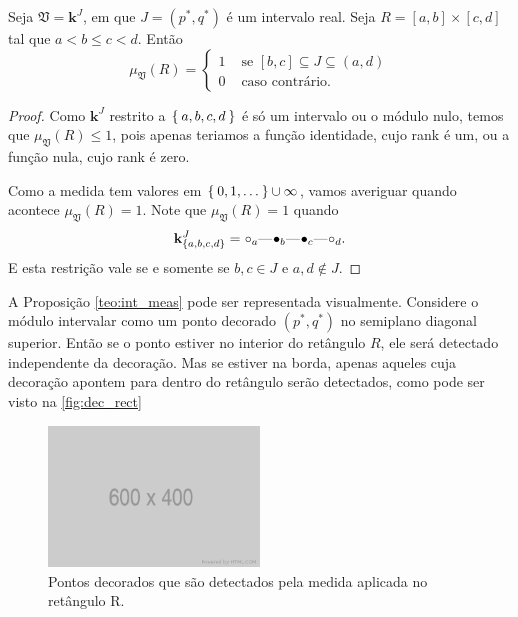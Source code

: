\begin{propo}\label{teo:int_meas}
    Seja $\mathfrak{V} = \mathbf{k}^J$, em que $J=(p^*, q^*)$ é um intervalo real. Seja $R=[a,b]\times[c,d]$
    tal que $a < b \leq c < d$. Então
    \begin{equation*}
        \mu_{\mathfrak{V}}(R) = \left\{
        \begin{split}
            1 & \text{ se } [b,c] \subseteq J \subseteq (a,d) \\
            0 & \text{ caso contrário.}
        \end{split}
        \right.
    \end{equation*}
\end{propo} 
\begin{proof}
    Como $\mathbf{k}^J$ restrito a $\Set{a,b,c,d}$ é só um intervalo ou o módulo nulo, temos que $\mu_{\mathfrak{V}}(R)
    \leq 1$, pois apenas teriamos a função identidade, cujo rank é um, ou a função nula, cujo rank é zero. 

    Como a medida tem valores em $\Set{0,1,\dots} \cup {\infty}$, vamos averiguar quando acontece $\mu_{\mathfrak{V}}(R)
    = 1$. Note que $\mu_{\mathfrak{V}}(R) = 1$ quando 
    \begin{equation*}    
        \mathbf{k}^J_{\{a,b,c,d\}} = \qoff{a} \qem \qon{b} \qem \qon{c} \qem \qoff{d}. 
    \end{equation*}
    E esta restrição vale se e somente se $b,c \in J$ e $a,d \nin J$.
\end{proof}

A Proposição \ref{teo:int_meas} pode ser representada visualmente. Considere o módulo intervalar como um ponto
decorado $(p^*, q^*)$ no semiplano diagonal superior. Então se o ponto estiver no interior do retângulo
$R$, ele será detectado independente da decoração. Mas se estiver na borda, apenas aqueles cuja decoração
apontem para dentro do retângulo serão detectados, como pode ser visto na \autoref{fig:dec_rect}
\begin{figure}[htpb!]
    \centering
    \includegraphics[width=0.5\textwidth]{images/placeholder.png}
    \caption{Pontos decorados que são detectados pela medida aplicada no retângulo R.}
    \label{fig:dec_rect}
    \fautor
\end{figure}

